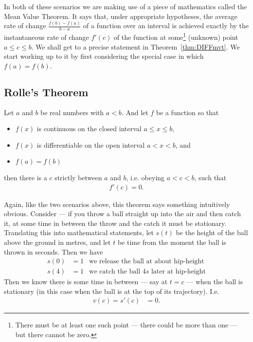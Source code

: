 In both of these scenarios we are making use of a piece of mathematics called the Mean
Value Theorem. It says that, under appropriate hypotheses, the average rate of change
$\frac{f(b)-f(a)}{b-a}$ of a function over an interval is achieved exactly by the
instantaneous rate of change $f'(c)$ of the function at some\footnote{There must be at
least one such point --- there could be more than one --- but there cannot be zero.}
(unknown) point $a\le c\le b$. We shall get to a precise statement in
Theorem~\ref{thm:DIFFmvt}. We start working up to it by first considering the special case
in which $f(a)=f(b)$.

\subsection*{Rolle's Theorem}
\begin{theorem}
\label{thm:DIFFrolle}
Let $a$ and $b$ be real numbers with $a<b$. And let $f$ be a function so that
\begin{itemize}
 \item $f(x)$ is continuous on the closed interval $a\le x\le b$,
  \item $f(x)$ is differentiable on the open interval $a<x<b$, and
 \item $f(a)=f(b)$
\end{itemize}
then there is a $c$ strictly between $a$ and $b$, i.e. obeying $a<c<b$, such that
\begin{align*}
f'(c)=0.
\end{align*}
\end{theorem}
Again, like the two scenarios above, this theorem says something intuitively obvious.
Consider --- if you throw a ball straight up into the air and then catch it, at some time
in between the throw and the catch it must be stationary. Translating this into
mathematical statements, let $s(t)$ be the height of the ball above the ground in metres,
and let $t$ be time from the moment the ball is thrown in seconds. Then we have
\begin{align*}
  s(0) &= 1 & \text{we release the ball at about hip-height} \\
  s(4) &= 1 & \text{we catch the ball $4s$ later at hip-height}
\end{align*}
Then we know there is some time in between --- say at $t=c$ --- when the ball is
stationary (in this case when the ball is at the top of its trajectory). I.e.
\begin{align*}
  v(c) = s'(c) &= 0.
\end{align*}
